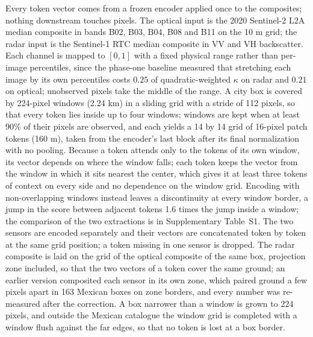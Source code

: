 \documentclass[11pt]{article}
\begin{document}
Every token vector comes from a frozen encoder applied once to the composites; nothing
downstream touches pixels. The optical input is the 2020 Sentinel-2 L2A median composite
in bands B02, B03, B04, B08 and B11 on the 10 m grid; the radar input is the Sentinel-1
RTC median composite in VV and VH backscatter. Each channel is mapped to $[0, 1]$ with a
fixed physical range rather than per-image percentiles, since the phase-one baseline
measured that stretching each image by its own percentiles costs $0.25$ of
quadratic-weighted $\kappa$ on radar and $0.21$ on optical; unobserved pixels take the
middle of the range. A city box is covered by 224-pixel windows (2.24 km) in a sliding
grid with a stride of 112 pixels, so that every token lies inside up to four windows;
windows are kept when at least 90\% of their pixels are observed, and each yields a 14
by 14 grid of 16-pixel patch tokens (160 m), taken from the encoder's last block after
its final normalization with no pooling. Because a token attends only to the tokens of
its own window, its vector depends on where the window falls; each token keeps the
vector from the window in which it sits nearest the center, which gives it at least
three tokens of context on every side and no dependence on the window grid. Encoding
with non-overlapping windows instead leaves a discontinuity at every window border, a
jump in the score between adjacent tokens 1.6 times the jump inside a window; the
comparison of the two extractions is in Supplementary Table~S1. The two sensors are encoded separately and their vectors are
concatenated token by token at the same grid position; a token missing in one sensor is
dropped. The radar composite is laid on the grid of the optical composite of the same
box, projection zone included, so that the two vectors of a token cover the same
ground; an earlier version composited each sensor in its own zone, which paired ground
a few pixels apart in 163 Mexican boxes on zone borders, and every number was
re-measured after the correction. A box narrower than a window is grown to 224 pixels,
and outside the Mexican catalogue the window grid is completed with a window flush
against the far edges, so that no token is lost at a box border.
\end{document}
